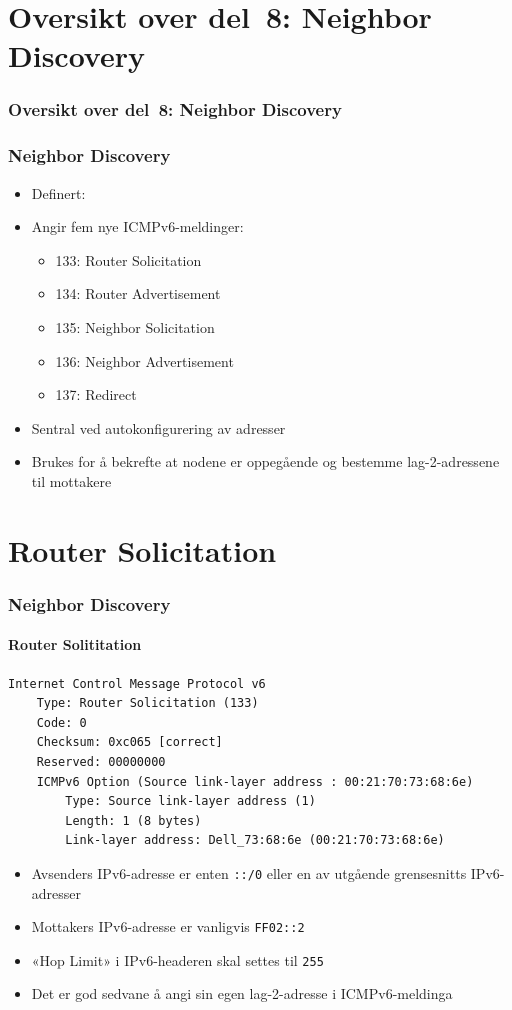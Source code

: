 \section*{Oversikt over del~8: Neighbor Discovery}
\begin{frame}[allowframebreaks]
  \frametitle{Oversikt over del~8: Neighbor Discovery}
  \tableofcontents%
\end{frame}

\begin{frame}%
  \frametitle{Neighbor Discovery}
  \pause
  \begin{itemize}[<+->]
  \item Definert: 
  \item Angir fem nye ICMPv6-meldinger:
    \begin{itemize}[<+->]
    \item 133: Router Solicitation
    \item 134: Router Advertisement
    \item 135: Neighbor Solicitation
    \item 136: Neighbor Advertisement
    \item 137: Redirect
    \end{itemize}
  \item Sentral ved autokonfigurering av adresser
  \item Brukes for å bekrefte at nodene er oppegående og bestemme
    lag-2-adressene til mottakere
  \end{itemize}
\end{frame}

\section{Router Solicitation}
\begin{frame}[fragile]%
  \frametitle{Neighbor Discovery}
  \framesubtitle{Router Solititation}
  \pause
\begin{Verbatim}[fontsize=\tiny]
Internet Control Message Protocol v6
    Type: Router Solicitation (133)
    Code: 0
    Checksum: 0xc065 [correct]
    Reserved: 00000000
    ICMPv6 Option (Source link-layer address : 00:21:70:73:68:6e)
        Type: Source link-layer address (1)
        Length: 1 (8 bytes)
        Link-layer address: Dell_73:68:6e (00:21:70:73:68:6e)
\end{Verbatim}
  \pause
  \begin{itemize}[<+->]
  \item Avsenders IPv6-adresse er enten \texttt{::/0} eller en av
    utgående grensesnitts IPv6-adresser
  \item Mottakers IPv6-adresse er vanligvis \texttt{FF02::2}
  \item «Hop Limit» i IPv6-headeren skal settes til \texttt{255}
  \item Det er god sedvane å angi sin egen lag-2-adresse i ICMPv6-meldinga
  \end{itemize}
\end{frame}

